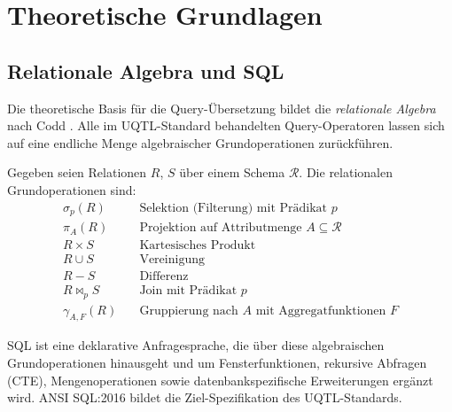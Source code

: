 ﻿%
\section{Theoretische Grundlagen}
\label{sec:grundlagen}

\subsection{Relationale Algebra und SQL}
\label{subsec:rel_algebra}

Die theoretische Basis für die Query-Übersetzung bildet die \emph{relationale
Algebra} nach Codd \cite{codd1970relational}. Alle im UQTL-Standard behandelten
Query-Operatoren lassen sich auf eine endliche Menge algebraischer
Grundoperationen zurückführen.

\begin{definition}
\label{def:rel_ops}
Gegeben seien Relationen $R$, $S$ über einem Schema $\mathcal{R}$.
Die relationalen Grundoperationen sind:
\begin{align*}
  \sigma_p(R) &\quad \text{Selektion (Filterung) mit Prädikat } p \\
  \pi_A(R)    &\quad \text{Projektion auf Attributmenge } A \subseteq \mathcal{R} \\
  R \times S  &\quad \text{Kartesisches Produkt} \\
  R \cup S    &\quad \text{Vereinigung} \\
  R - S       &\quad \text{Differenz} \\
  R \bowtie_p S &\quad \text{Join mit Prädikat } p \\
  \gamma_{A,F}(R) &\quad \text{Gruppierung nach } A \text{ mit Aggregatfunktionen } F
\end{align*}
\end{definition}

SQL ist eine deklarative Anfragesprache, die über diese algebraischen
Grundoperationen hinausgeht und um Fensterfunktionen, rekursive Abfragen
(CTE), Mengenoperationen sowie datenbankspezifische Erweiterungen ergänzt wird.
ANSI SQL:2016 \cite{ansi_sql_2016} bildet die Ziel-Spezifikation des UQTL-Standards.


